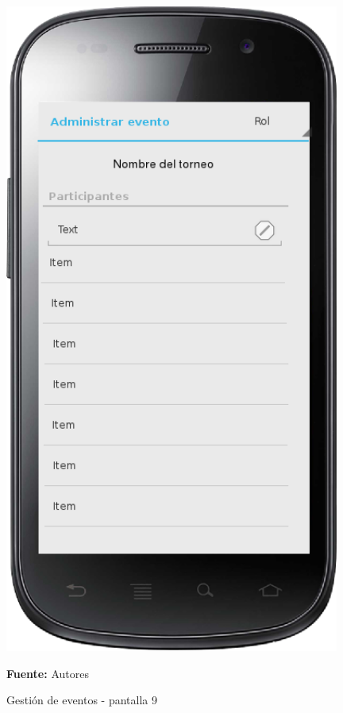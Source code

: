 \begin{figure}[!htb]
  \begin{center}
    \includegraphics[width=11cm]{./imagenes/UI/Eventos/gestion_eventos_9.png}
    \caption{Gestión de eventos - pantalla 9}
    \label{fig:gestion_eventos_9}
    \textbf{Fuente:}  Autores
  \end{center}
\end{figure}

